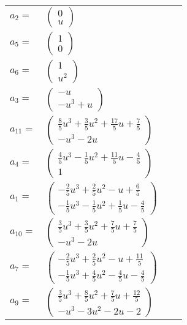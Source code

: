 \documentclass[1p]{elsarticle_modified}
\theoremstyle{definition}
\begin{document}
\begin{tabular}{m{7pt} m{180pt} m{7pt} m{180pt} }
\flushright $a_{2}=$&$\begin{pmatrix}0\\u\end{pmatrix}$ \\
\flushright $a_{5}=$&$\begin{pmatrix}1\\0\end{pmatrix}$ \\
\flushright $a_{6}=$&$\begin{pmatrix}1\\u^2\end{pmatrix}$ \\
\flushright $a_{3}=$&$\begin{pmatrix}- u\\- u^3+u\end{pmatrix}$ \\
\flushright $a_{11}=$&$\begin{pmatrix}\frac{8}{5} u^3+\frac{3}{5} u^2+\frac{17}{5} u+\frac{7}{5}\\- u^3-2 u\end{pmatrix}$ \\
\flushright $a_{4}=$&$\begin{pmatrix}\frac{4}{5} u^3-\frac{1}{5} u^2+\frac{11}{5} u-\frac{4}{5}\\1\end{pmatrix}$ \\
\flushright $a_{1}=$&$\begin{pmatrix}-\frac{2}{5} u^3+\frac{2}{5} u^2- u+\frac{6}{5}\\-\frac{1}{5} u^3-\frac{1}{5} u^2+\frac{1}{5} u-\frac{4}{5}\end{pmatrix}$ \\
\flushright $a_{10}=$&$\begin{pmatrix}\frac{3}{5} u^3+\frac{3}{5} u^2+\frac{7}{5} u+\frac{7}{5}\\- u^3-2 u\end{pmatrix}$ \\
\flushright $a_{7}=$&$\begin{pmatrix}-\frac{2}{5} u^3+\frac{2}{5} u^2- u+\frac{11}{5}\\-\frac{1}{5} u^3+\frac{4}{5} u^2-\frac{4}{5} u-\frac{4}{5}\end{pmatrix}$ \\
\flushright $a_{9}=$&$\begin{pmatrix}\frac{3}{5} u^3+\frac{8}{5} u^2+\frac{7}{5} u+\frac{12}{5}\\- u^3-3 u^2-2 u-2\end{pmatrix}$ \\

\end{tabular}
\end{document}
